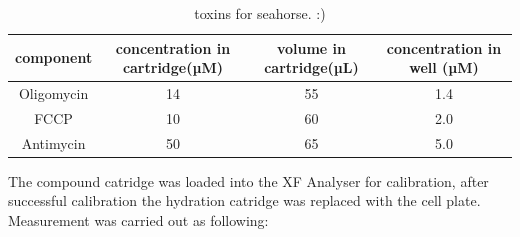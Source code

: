     \begin{table}[h]
    \capstart
    \centering
    \begin{minipage}{\captionwidth}
        \caption[toxins for seahorse]{\newline toxins for seahorse. :)}
        \label{tab:seahorse_toxins}
    \end{minipage}
    \begin{tabular}{|c|c|c|c|}
        \hline
        component  & concentration in cartridge(µM) & volume in cartridge(µL) & concentration in well (µM) \\ \hline
        Oligomycin & 14                             & 55                      & 1.4                        \\
        FCCP       & 10                             & 60                      & 2.0                        \\
        Antimycin  & 50                             & 65                      & 5.0                        \\ \hline
    \end{tabular}
    \end{table}

    The compound catridge was loaded into the XF Analyser for calibration, after successful calibration the hydration catridge was replaced with the cell plate. Measurement was carried out as following:

